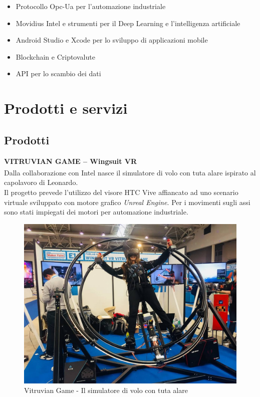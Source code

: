 \begin{itemize}
\item Protocollo Opc-Ua per l’automazione industriale 
\item Movidius Intel e strumenti per il Deep Learning e l’intelligenza artificiale
\item Android Studio e Xcode per lo sviluppo di applicazioni mobile
\item Blockchain e Criptovalute 
\item API per lo scambio dei dati
\end{itemize}

\newpage
\section{Prodotti e servizi}
\subsection{Prodotti}
\textbf{VITRUVIAN GAME – Wingsuit VR}
\\
Dalla collaborazione con Intel\textsuperscript{\textregistered} nasce il simulatore di volo con tuta alare ispirato al capolavoro di Leonardo.\\
Il progetto prevede l'utilizzo del visore HTC Vive affiancato ad uno scenario virtuale sviluppato con motore grafico \textit{Unreal Engine}. Per i movimenti sugli assi sono stati impiegati dei motori per automazione industriale.
\\
\begin{figure}[H]
	\begin{center}
	\includegraphics[scale=0.15]{immagini/vitruvian.jpg}
	\caption{Vitruvian Game - Il simulatore di volo con tuta alare}
	\end{center}
\end{figure}


